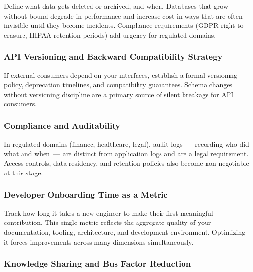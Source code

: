 Define what data gets deleted or archived, and when. Databases that grow without bound degrade in performance and increase cost in ways that are often invisible until they become incidents. Compliance requirements (GDPR right to erasure, HIPAA retention periods) add urgency for regulated domains.

\subsubsection*{API Versioning and Backward Compatibility Strategy}\label{writing-good-code:api-versioning-and-backward-compatibility-strategy}

If external consumers depend on your interfaces, establish a formal versioning policy, deprecation timelines, and compatibility guarantees. Schema changes without versioning discipline are a primary source of silent breakage for API consumers.

\subsubsection*{Compliance and Auditability}\label{writing-good-code:compliance-and-auditability}

In regulated domains (finance, healthcare, legal), audit logs~--- recording who did what and when~--- are distinct from application logs and are a legal requirement. Access controls, data residency, and retention policies also become non-negotiable at this stage.

\subsubsection*{Developer Onboarding Time as a Metric}\label{writing-good-code:developer-onboarding-time-as-a-metric}

Track how long it takes a new engineer to make their first meaningful contribution. This single metric reflects the aggregate quality of your documentation, tooling, architecture, and development environment. Optimizing it forces improvements across many dimensions simultaneously.

\subsubsection*{Knowledge Sharing and Bus Factor Reduction}\label{writing-good-code:knowledge-sharing-and-bus-factor-reduction}


